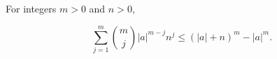 For integers $m > 0$ and $n > 0$,

$$\sum_{j=1}^m \binom{m}{j} |a|^{m-j} n^j \leq (|a| + n)^m - |a|^m.$$
